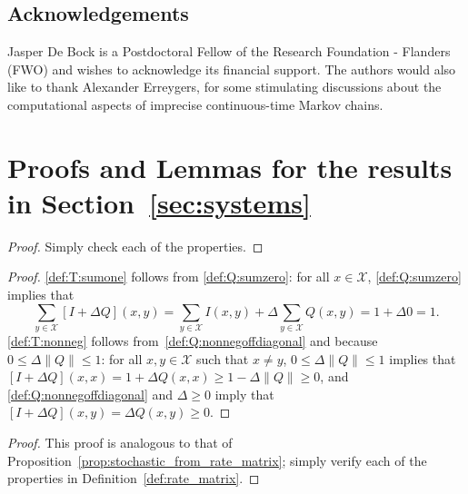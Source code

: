 \documentclass[10pt,a4paper]{paper}
\theoremstyle{definition}
\newcommand{\states}{\mathcal{X}}
\newcommand{\norm}[1]{\left\lVert #1 \right\rVert}
\begin{document}
\subsection*{Acknowledgements}

Jasper De Bock is a Postdoctoral Fellow of the Research Foundation - Flanders (FWO) and wishes to acknowledge its financial support. The authors would also like to thank Alexander Erreygers, for some stimulating discussions about the computational aspects of imprecise continuous-time Markov chains.

 


\appendix

\section{Proofs and Lemmas for the results in Section~\ref{sec:systems}}\label{app:systems}

\lemmacompositiontransitionmatrix*
\begin{proof}
Simply check each of the properties.
\end{proof}

\propstochasticfromratematrix*
\begin{proof}%
\ref{def:T:sumone} follows from \ref{def:Q:sumzero}: for all $x\in\states$, \ref{def:Q:sumzero} implies that
\begin{equation*}
\sum_{y\in\states} [I + \Delta Q](x,y) = \sum_{y\in\states}I(x,y) + \Delta \sum_{y\in\states}Q(x,y) = 1+\Delta 0=1.
\end{equation*}
\ref{def:T:nonneg} follows from~\ref{def:Q:nonnegoffdiagonal} and because $0\leq \Delta\norm{Q} \leq 1$: for all $x,y\in\states$ such that $x\neq y$, $0\leq\Delta\norm{Q} \leq 1$ implies that $[I+\Delta Q](x,x)=1+\Delta Q(x,x)\geq 1-\Delta\norm{Q}\geq0$, and \ref{def:Q:nonnegoffdiagonal} and $\Delta\geq0$ imply that $[I+\Delta Q](x,y)=\Delta Q(x,y)\geq0$.
\end{proof}

\propratefromstochasticmatrix*
\begin{proof}
This proof is analogous to that of Proposition~\ref{prop:stochastic_from_rate_matrix}; simply verify each of the properties in Definition~\ref{def:rate_matrix}.
\end{proof}
\end{document}
